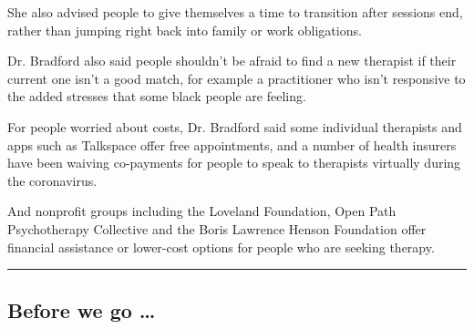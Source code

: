 She also advised people to give themselves a time to transition after
sessions end, rather than jumping right back into family or work
obligations.

Dr. Bradford also said people shouldn't be afraid to find a new
therapist if their current one isn't a good match, for example a
practitioner who isn't responsive to the added stresses that some black
people are feeling.

For people worried about costs, Dr. Bradford said some individual
therapists and apps such as Talkspace offer free appointments, and a
number of health insurers have been waiving co-payments for people to
speak to therapists virtually during the coronavirus.

And nonprofit groups including the Loveland Foundation, Open Path
Psychotherapy Collective and the Boris Lawrence Henson Foundation offer
financial assistance or lower-cost options for people who are seeking
therapy.

\begin{center}\rule{0.5\linewidth}{\linethickness}\end{center}

\hypertarget{before-we-go-}{%
\subsection{Before we go \ldots{}}\label{before-we-go-}}

